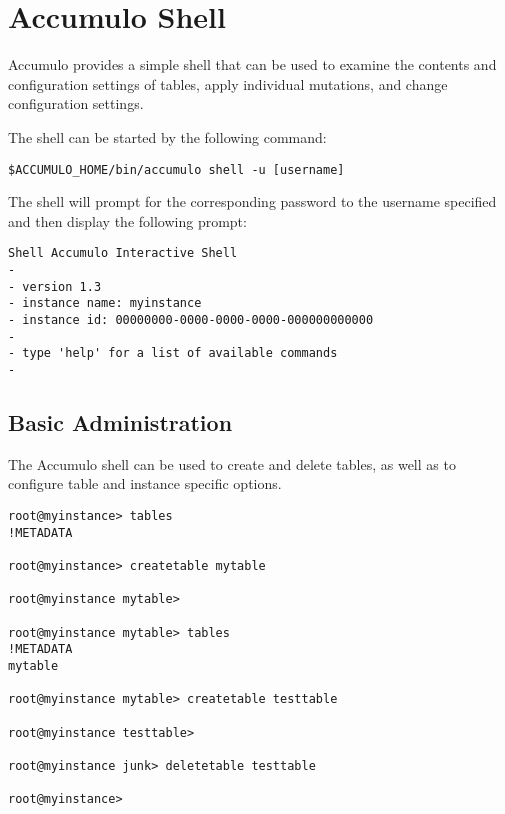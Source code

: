 
%
%

\chapter{Accumulo Shell}
Accumulo provides a simple shell that can be used to examine the contents and
configuration settings of tables, apply individual mutations, and change
configuration settings.

The shell can be started by the following command:

\small
\begin{verbatim}
$ACCUMULO_HOME/bin/accumulo shell -u [username]
\end{verbatim}

\normalsize

The shell will prompt for the corresponding password to the username specified
and then display the following prompt:

\small
\begin{verbatim}
Shell Accumulo Interactive Shell
-
- version 1.3
- instance name: myinstance
- instance id: 00000000-0000-0000-0000-000000000000
-
- type 'help' for a list of available commands
-
\end{verbatim}
\normalsize

\section{Basic Administration}

The Accumulo shell can be used to create and delete tables, as well as to configure
table and instance specific options.

\small
\begin{verbatim}
root@myinstance> tables
!METADATA

root@myinstance> createtable mytable

root@myinstance mytable>

root@myinstance mytable> tables
!METADATA
mytable

root@myinstance mytable> createtable testtable

root@myinstance testtable>

root@myinstance junk> deletetable testtable

root@myinstance>
\end{verbatim}
\normalsize

